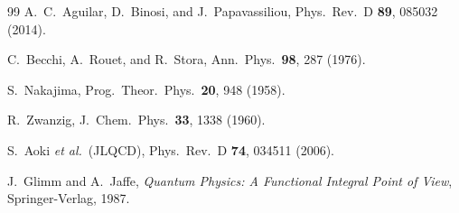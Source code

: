 \documentclass[aps,prd,reprint,superscriptaddress,floatfix]{revtex4-2}
\theoremstyle{definition}
\begin{document}
\begin{thebibliography}{99}
  A.~C.~Aguilar, D.~Binosi, and J.~Papavassiliou,
  Phys.\ Rev.\ D \textbf{89}, 085032 (2014).

  C.~Becchi, A.~Rouet, and R.~Stora,
  Ann.\ Phys.\ \textbf{98}, 287 (1976).

  S.~Nakajima,
  Prog.\ Theor.\ Phys.\ \textbf{20}, 948 (1958).

  R.~Zwanzig,
  J.\ Chem.\ Phys.\ \textbf{33}, 1338 (1960).

  S.~Aoki \textit{et al.}\ (JLQCD),
  Phys.\ Rev.\ D \textbf{74}, 034511 (2006).

  J.~Glimm and A.~Jaffe,
  \textit{Quantum Physics: A Functional Integral Point of View},
  Springer-Verlag, 1987.

\end{thebibliography}
\end{document}
